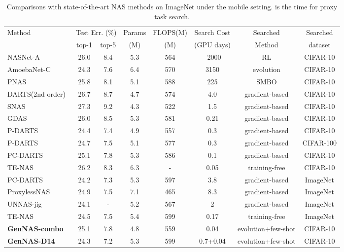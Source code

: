 \documentclass{article}
\begin{document}
\begin{table}[]
\scriptsize
  \caption{Comparisons with state-of-the-art NAS methods on ImageNet under the mobile setting.  is the time for proxy task search.
  }
  \label{table:GenNAS_NAS_Imagenet}
  \centering
  \scriptsize
\begin{tabular}{lccccccc}
\toprule
\multirow{2}{*}{Method} & \multicolumn{2}{c}{Test Err. (\%)} & Params & FLOPS(M) & Search Cost & Searched & Searched \\ \cline{2-3} 
                        & top-1          & top-5         &(M)&(M)&(GPU days)&Method&dataset
      \\ \midrule 
NASNet-A~\cite{zoph2018learning} &  26.0 &8.4&5.3&564&~2000&RL&CIFAR-10\\
AmoebaNet-C~\cite{real2019regularized} & 24.3 & 7.6 &  6.4 & 570 & 3150&evolution&CIFAR-10\\
PNAS~\cite{liu2018progressive}&25.8&8.1&5.1&588&225&SMBO&CIFAR-10\\
\midrule
DARTS(2nd order)~\cite{liu2018darts} &26.7& 8.7& 4.7& 574& 4.0& gradient-based&CIFAR-10\\

SNAS~\cite{xie2018snas}&27.3&9.2&4.3& 522& 1.5&gradient-based&CIFAR-10\\
GDAS~\cite{dong2019searching}&26.0&8.5&5.3&581&0.21&gradient-based&CIFAR-10\\
P-DARTS~\cite{chen2019progressive}&24.4&7.4 &4.9 &557 &0.3 &gradient-based &CIFAR-10\\
P-DARTS&24.7&7.5&5.1 &577 &0.3 &gradient-based &CIFAR-100\\
PC-DARTS~\cite{xu2019pc}&25.1 &7.8 &5.3 &586 &0.1 &gradient-based&CIFAR-10\\
TE-NAS~\cite{chen2021neural}&26.2 &8.3 &6.3&-& 0.05& training-free&CIFAR-10\\
\midrule
PC-DARTS&24.2 &7.3 &5.3 &597 &3.8 &gradient-based&ImageNet\\
ProxylessNAS~\cite{cai2018proxylessnas} &  24.9 &7.5 &7.1 &465 &8.3 &gradient-based&ImageNet\\
UNNAS-jig~\cite{liu2020labels}&24.1&-&5.2&567&2&gradient-based&ImageNet\\
TE-NAS& 24.5  &7.5 &5.4 & 599&0.17&training-free&ImageNet\\
\midrule
\textbf{GenNAS-combo} & 25.1&7.8&4.8&559&0.04&evolution+few-shot&CIFAR-10\\
\textbf{GenNAS-D14} & 24.3&7.2&5.3&599&0.7+0.04&evolution+few-shot&CIFAR-10\\
\bottomrule

\end{tabular}
\end{table}
\end{document}
